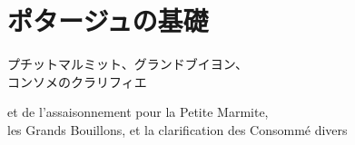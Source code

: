 \href{原稿下準備20180414五島、連載からコピー}{} \href{訳と注釈}{}
\href{未、原文対照チェック}{} \href{未、日本語表現校正}{}
\href{未、その他修正}{} \href{未、原稿最終校正}{}

\hypertarget{ux30ddux30bfux30fcux30b8ux30e5ux306eux57faux790e}{%
\section{ポタージュの基礎}\label{ux30ddux30bfux30fcux30b8ux30e5ux306eux57faux790e}}

\vspace{-.5\zw}
\begin{center}
\headfont\medlarge プチットマルミット、グランドブイヨン、\\コンソメのクラリフィエ \normalfont\normalsize
\end{center}
\vspace{2ex}
\vspace{-1ex}
\begin{center}
\headfont et de l'assaisonnement pour la Petite Marmite,\\ les Grands Bouillons,
et la clarification des Consommé divers

\end{center}
\normalfont
{}
